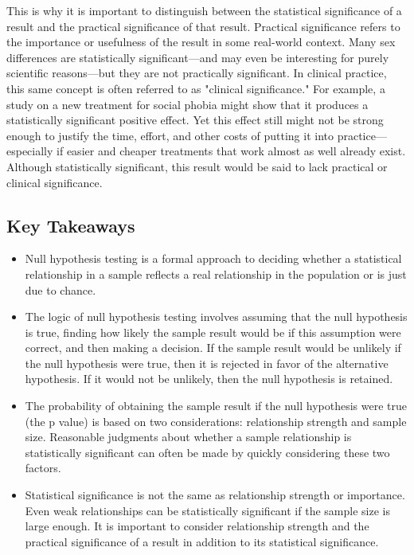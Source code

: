 This is why it is important to distinguish between the statistical significance of a result and the practical significance of that result. Practical significance refers to the importance or usefulness of the result in some real-world context. Many sex differences are statistically significant---and may even be interesting for purely scientific reasons---but they are not practically significant. In clinical practice, this same concept is often referred to as "clinical significance." For example, a study on a new treatment for social phobia might show that it produces a statistically significant positive effect. Yet this effect still might not be strong enough to justify the time, effort, and other costs of putting it into practice---especially if easier and cheaper treatments that work almost as well already exist. Although statistically significant, this result would be said to lack practical or clinical significance.


\subsection{Key Takeaways}
\begin{fullwidth}
\begin{itemize}
\item Null hypothesis testing is a formal approach to deciding whether a statistical relationship in a sample reflects a real relationship in the population or is just due to chance.

\item The logic of null hypothesis testing involves assuming that the null hypothesis is true, finding how likely the sample result would be if this assumption were correct, and then making a decision. If the sample result would be unlikely if the null hypothesis were true, then it is rejected in favor of the alternative hypothesis. If it would not be unlikely, then the null hypothesis is retained.

\item The probability of obtaining the sample result if the null hypothesis were true (the p value) is based on two considerations: relationship strength and sample size. Reasonable judgments about whether a sample relationship is statistically significant can often be made by quickly considering these two factors.

\item Statistical significance is not the same as relationship strength or importance. Even weak relationships can be statistically significant if the sample size is large enough. It is important to consider relationship strength and the practical significance of a result in addition to its statistical significance.

\end{itemize}
\end{fullwidth}




